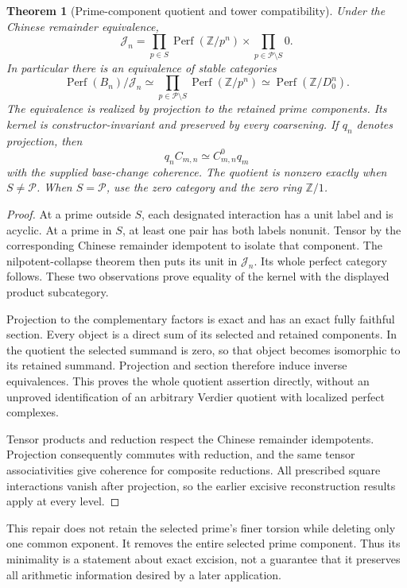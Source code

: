 \documentclass[11pt]{article}
\newtheorem{theorem}{Theorem}[section]
\theoremstyle{definition}
\theoremstyle{remark}
\begin{document}
\begin{theorem}[Prime-component quotient and tower compatibility]\label{thm:finite-prime-quotient}
Under the Chinese remainder equivalence,
\[
 \boxed{\mathcal J_n=
 \prod_{p\in S}\operatorname{Perf}(\mathbb Z/p^n)
 \times\prod_{p\in\mathcal P\setminus S}0.}
\]
In particular there is an equivalence of stable categories
\[
 \operatorname{Perf}(B_n)/\mathcal J_n
 \simeq \prod_{p\in\mathcal P\setminus S}\operatorname{Perf}(\mathbb Z/p^n)
 \simeq\operatorname{Perf}(\mathbb Z/D_0^n).
\]
The equivalence is realized by projection to the retained prime components. Its kernel is constructor-invariant and preserved by every coarsening. If $q_n$ denotes projection, then
\[
 q_nC_{m,n}\simeq C^0_{m,n}q_m
\]
with the supplied base-change coherence. The quotient is nonzero exactly when $S\ne\mathcal P$. When $S=\mathcal P$, use the zero category and the zero ring $\mathbb Z/1$.
\end{theorem}
\begin{proof}
At a prime outside $S$, each designated interaction has a unit label and is acyclic. At a prime in $S$, at least one pair has both labels nonunit. Tensor by the corresponding Chinese remainder idempotent to isolate that component. The nilpotent-collapse theorem then puts its unit in $\mathcal J_n$. Its whole perfect category follows. These two observations prove equality of the kernel with the displayed product subcategory.

Projection to the complementary factors is exact and has an exact fully faithful section. Every object is a direct sum of its selected and retained components. In the quotient the selected summand is zero, so that object becomes isomorphic to its retained summand. Projection and section therefore induce inverse equivalences. This proves the whole quotient assertion directly, without an unproved identification of an arbitrary Verdier quotient with localized perfect complexes.

Tensor products and reduction respect the Chinese remainder idempotents. Projection consequently commutes with reduction, and the same tensor associativities give coherence for composite reductions. All prescribed square interactions vanish after projection, so the earlier excisive reconstruction results apply at every level.
\end{proof}

This repair does not retain the selected prime's finer torsion while deleting only one common exponent. It removes the entire selected prime component. Thus its minimality is a statement about exact excision, not a guarantee that it preserves all arithmetic information desired by a later application.
\end{document}
